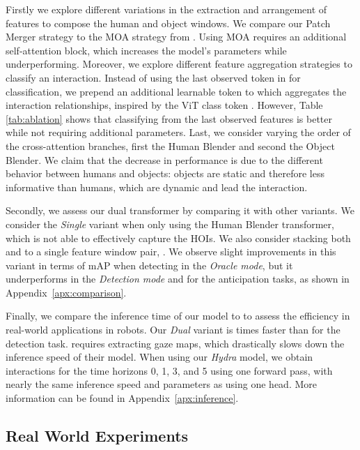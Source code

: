\documentclass{article}
\begin{document}
Firstly we explore different variations in the extraction and arrangement of features to compose the human and object windows. We compare our Patch Merger strategy to the MOA strategy from \citep{park2023viplo}. Using MOA requires an additional self-attention block, which increases the model's parameters while underperforming. Moreover, we explore different feature aggregation strategies to classify an interaction. Instead of using the last observed token in  for classification, we prepend an additional learnable token to  which aggregates the interaction relationships, inspired by the ViT class token \citep{dosovitskiy2020vit}. However, Table \ref{tab:ablation} shows that classifying from the last observed features is better while not requiring additional parameters. Last, we consider varying the order of the cross-attention branches, first the Human Blender and second the Object Blender. We claim that the decrease in performance is due to the different behavior between humans and objects: objects are static and therefore less informative than humans, which are dynamic and lead the interaction.



Secondly, we assess our dual transformer by comparing it with other variants. We consider the \textit{Single} variant when only using the Human Blender transformer, which is not able to effectively capture the HOIs. We also consider stacking both  and  to a single feature window pair, . 
We observe slight improvements in this variant in terms of mAP when detecting in the \textit{Oracle mode}, but it underperforms in the \textit{Detection mode} and for the anticipation tasks, as shown in Appendix~\ref{apx:comparison}.

Finally, we compare the inference time of our model to \citep{NI2023103741}  to assess the efficiency in real-world applications in robots. Our \textit{Dual} variant is  times faster than \citep{NI2023103741} for the detection task. \citep{NI2023103741} requires extracting gaze maps, which drastically slows down the inference speed of their model. When using our \textit{Hydra} model, we obtain interactions for the time horizons 0, 1, 3, and 5 using one forward pass, with nearly the same inference speed and parameters as using one head. More information can be found in Appendix~\ref{apx:inference}.


\subsection{Real World Experiments}
\end{document}
